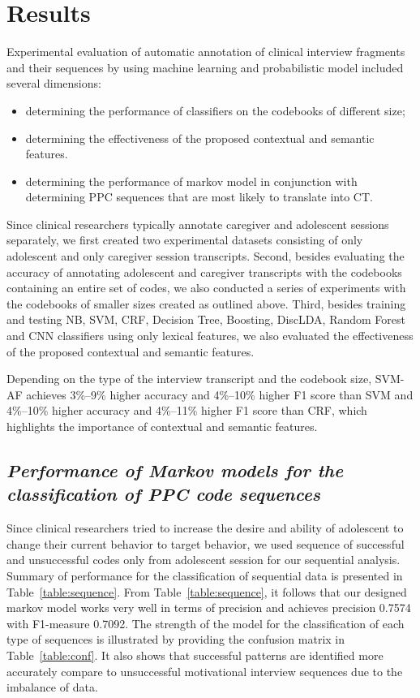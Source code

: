 \documentclass{amia}
\begin{document}
\section*{Results}
Experimental evaluation of automatic annotation of clinical interview fragments and their sequences by using machine learning and probabilistic model included several dimensions:
\begin{itemize}
\item determining the performance of classifiers on the codebooks of different size;
\item determining the effectiveness of the proposed contextual and semantic features.
\item determining the performance of markov model in conjunction with determining PPC sequences that are most likely to translate into CT.
\end{itemize}

Since clinical researchers typically annotate caregiver and adolescent sessions separately, we first created two experimental datasets consisting of only adolescent and only caregiver session transcripts. Second, besides evaluating the accuracy of annotating adolescent and caregiver transcripts with the codebooks containing an entire set of codes, we also conducted a series of experiments with the codebooks of smaller sizes created as outlined above. Third, besides training and testing NB, SVM, CRF, Decision Tree, Boosting, DiscLDA, Random Forest and CNN classifiers using only lexical features, we also evaluated the effectiveness of the proposed contextual and semantic features.

Depending on the type of the interview transcript and the codebook size, SVM-AF achieves 3\%--9\% higher accuracy and 4\%--10\% higher F1 score than SVM and 4\%--10\% higher accuracy and 4\%--11\% higher F1 score than CRF, which highlights the importance of contextual and semantic features. 

\subsection*{\textit{Performance of Markov models for the classification of PPC code sequences}}
Since clinical researchers tried to increase the desire and ability of adolescent to change their current behavior to target behavior, we used sequence of successful and unsuccessful codes only from adolescent session for our sequential analysis. Summary of performance for the classification of sequential data is presented in Table~\ref{table:sequence}. From Table~\ref{table:sequence}, it follows that our designed markov model works very well in terms of precision and achieves precision 0.7574 with F1-measure 0.7092. The strength of the model for the classification of each type of sequences is illustrated by providing the confusion matrix in Table~\ref{table:conf}. It also shows that successful patterns are identified more accurately compare to unsuccessful motivational interview sequences due to the imbalance of data. \\
\end{document}
